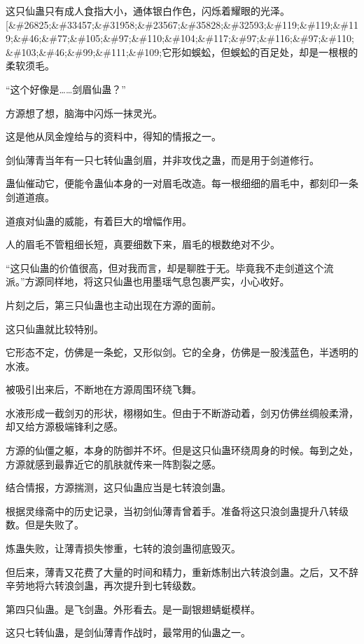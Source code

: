 
\begin{this_body}

这只仙蛊只有成人食指大小，通体银白作色，闪烁着耀眼的光泽。[\&\#26825;\&\#33457;\&\#31958;\&\#23567;\&\#35828;\&\#32593;\&\#119;\&\#119;\&\#119;\&\#46;\&\#77;\&\#105;\&\#97;\&\#110;\&\#104;\&\#117;\&\#97;\&\#116;\&\#97;\&\#110;\&\#103;\&\#46;\&\#99;\&\#111;\&\#109;它形如蜈蚣，但蜈蚣的百足处，却是一根根的柔软须毛。

“这个好像是……剑眉仙蛊？”

方源想了想，脑海中闪烁一抹灵光。

这是他从凤金煌给与的资料中，得知的情报之一。

剑仙薄青当年有一只七转仙蛊剑眉，并非攻伐之蛊，而是用于剑道修行。

蛊仙催动它，便能令蛊仙本身的一对眉毛改造。每一根细细的眉毛中，都刻印一条剑道道痕。

道痕对仙蛊的威能，有着巨大的增幅作用。

人的眉毛不管粗细长短，真要细数下来，眉毛的根数绝对不少。

“这只仙蛊的价值很高，但对我而言，却是聊胜于无。毕竟我不走剑道这个流派。”方源同样地，将这只仙蛊也用墨瑶气息包裹严实，小心收好。

片刻之后，第三只仙蛊也主动出现在方源的面前。

这只仙蛊就比较特别。

它形态不定，仿佛是一条蛇，又形似剑。它的全身，仿佛是一股浅蓝色，半透明的水液。

被吸引出来后，不断地在方源周围环绕飞舞。

水液形成一截剑刃的形状，栩栩如生。但由于不断游动着，剑刃仿佛丝绸般柔滑，却又给方源极端锋利之感。

方源的仙僵之躯，本身的防御并不坏。但是这只仙蛊环绕周身的时候。每到之处，方源就感到最靠近它的肌肤就传来一阵割裂之感。

结合情报，方源揣测，这只仙蛊应当是七转浪剑蛊。

根据灵缘斋中的历史记录，当初剑仙薄青曾着手。准备将这只浪剑蛊提升八转级数。但是失败了。

炼蛊失败，让薄青损失惨重，七转的浪剑蛊彻底毁灭。

但后来，薄青又花费了大量的时间和精力，重新炼制出六转浪剑蛊。之后，又不辞辛劳地将六转浪剑蛊，再次提升到七转级数。

第四只仙蛊。是飞剑蛊。外形看去。是一副银翅蜻蜓模样。

这只七转仙蛊，是剑仙薄青作战时，最常用的仙蛊之一。


\end{this_body}
